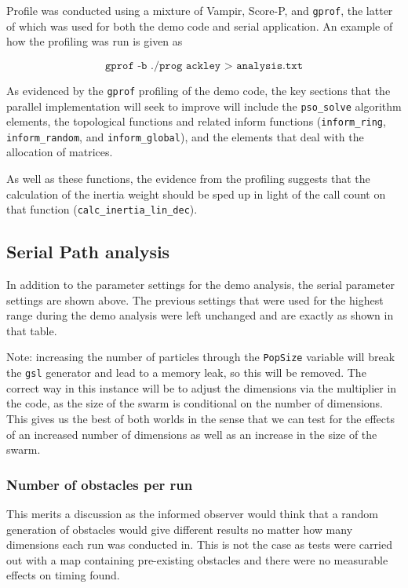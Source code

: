 \documentclass[KomodoMain.tex]{subfiles}
\begin{document}
Profile was conducted using a mixture of Vampir, Score-P, and \texttt{gprof}, the latter of which was used for both the demo code and serial application. An example of how the profiling was run is given as

$$ \texttt{gprof -b ./prog ackley > analysis.txt}$$

\newpage

{\small }

As evidenced by the \texttt{gprof} profiling of the demo code, the key sections that the parallel implementation will seek to improve will include the \texttt{pso\_solve} algorithm elements, the topological functions and related inform functions (\texttt{inform\_ring}, \texttt{inform\_random}, and \texttt{inform\_global}), and the elements that deal with the allocation of matrices.
\par
As well as these functions, the evidence from the profiling suggests that the calculation of the inertia weight should be sped up in light of the call count on that function (\texttt{calc\_inertia\_lin\_dec}).


\newpage
\subsection{Serial Path analysis}




In addition to the parameter settings for the demo analysis, the serial parameter settings are shown above. The previous settings that were used for the highest range during the demo analysis were left unchanged and are exactly as shown in that table.
\par
Note: increasing the number of particles through the \texttt{PopSize} variable will break the \texttt{gsl} generator and lead to a memory leak, so this will be removed. The correct way in this instance will be to adjust the dimensions via the multiplier in the code, as the size of the swarm is conditional on the number of dimensions. This gives us the best of both worlds in the sense that we can test for the effects of an increased number of dimensions as well as an increase in the size of the swarm.

\subsubsection{Number of obstacles per run}
This merits a discussion as the informed observer would think that a random generation of obstacles would give different results no matter how many dimensions each run was conducted in. This is not the case as tests were carried out with a map containing pre-existing obstacles and there were no measurable effects on timing found.
\end{document}
